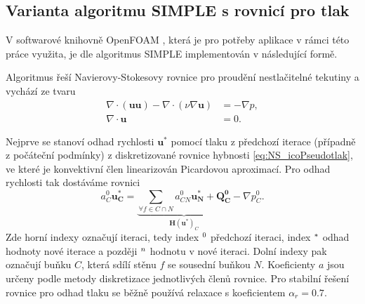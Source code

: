 \subsection{Varianta algoritmu SIMPLE s rovnicí pro tlak}
V softwarové knihovně OpenFOAM \cite{weller1998tensorial}, která je pro potřeby aplikace v rámci této práce využita, je dle \cite{furst2020mko2} algoritmus SIMPLE implementován v následující formě. 

Algoritmus řeší Navierovy-Stokesovy rovnice pro proudění nestlačitelné tekutiny a vychází ze tvaru
\begin{align}
\nabla \cdot (\mathbf{u} \mathbf{u} ) - \nabla \cdot (\nu \nabla \mathbf{u}) &= - \nabla p, \label{eq:simple_hyb}\\
\nabla \cdot \mathbf{u} &=0. \label{eq:simple_kont}
\end{align}

Nejprve se stanoví odhad rychlosti $ \mathbf{u}^* $ pomocí tlaku z předchozí iterace (případně z počáteční podmínky) z diskretizované rovnice hybnosti \ref{eq:NS_icoPseudotlak}, ve které je konvektivní člen linearizován Picardovou aproximací\cite{furst2020mko2}. Pro odhad rychlosti tak dostáváme rovnici
\begin{equation}\label{eq:simple_odhadU}
a_C^0\mathbf{u_C^*}
=
\underbrace{\sum_{\forall f \in C\cap N} a_{CN}^0 \mathbf{u_N^*}+\mathbf{Q_C^0}}_{\mathbf{H}(\mathbf{u^*})_C}-\nabla p_C^0.
\end{equation}
Zde horní indexy označují iteraci, tedy index $ \null^0 $ předchozí iteraci, index $ \null^* $ odhad hodnoty nové iterace a později $ \null^n $ hodnotu v nové iteraci. Dolní indexy pak označují buňku $ C $, která sdílí stěnu $ f $ se sousední buňkou $ N $. Koeficienty $ a $ jsou určeny podle metody diskretizace jednotlivých členů rovnice. Pro stabilní řešení rovnice pro odhad tlaku se běžně používá relaxace s koeficientem $ \alpha_r=0.7 $.

